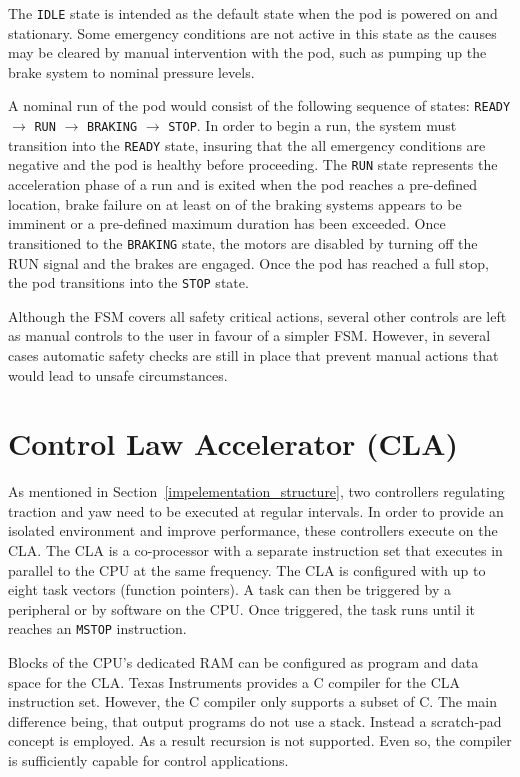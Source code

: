 The \texttt{IDLE} state is intended as the default state when the pod is powered on and stationary. Some emergency conditions are not active in this state as the causes may be cleared by manual intervention with the pod, such as pumping up the brake system to nominal pressure levels.

A nominal run of the pod would consist of the following sequence of states: \texttt{READY} $\rightarrow$ \texttt{RUN} $\rightarrow$ \texttt{BRAKING} $\rightarrow$ \texttt{STOP}. In order to begin a run, the system must transition into the \texttt{READY} state, insuring that the all emergency conditions are negative and the pod is healthy before proceeding. The \texttt{RUN} state represents the acceleration phase of a run and is exited when the pod reaches a pre-defined location, brake failure on at least on of the braking systems appears to be imminent or a pre-defined maximum duration has been exceeded. Once transitioned to the \texttt{BRAKING} state, the motors are disabled by turning off the RUN signal and the brakes are engaged. Once the pod has reached a full stop, the pod transitions into the \texttt{STOP} state.

Although the FSM covers all safety critical actions, several other controls are left as manual controls to the user in favour of a simpler FSM. However, in several cases automatic safety checks are still in place that prevent manual actions that would lead to unsafe circumstances.

\section{Control Law Accelerator (CLA)}

As mentioned in Section~\ref{impelementation_structure}, two controllers regulating traction and yaw need to be executed at regular intervals. In order to provide an isolated environment and improve performance, these controllers execute on the CLA. The CLA is a co-processor with a separate instruction set that executes in parallel to the CPU at the same frequency. The CLA is configured with up to eight task vectors (function pointers). A task can then be triggered by a peripheral or by software on the CPU. Once triggered, the task runs until it reaches an \texttt{MSTOP} instruction.

Blocks of the CPU's dedicated RAM can be configured as program and data space for the CLA. Texas Instruments provides a C compiler for the CLA instruction set. However, the C compiler only supports a subset of C. The main difference being, that output programs do not use a stack. Instead a scratch-pad concept is employed. As a result recursion is not supported. Even so, the compiler is sufficiently capable for control applications.

